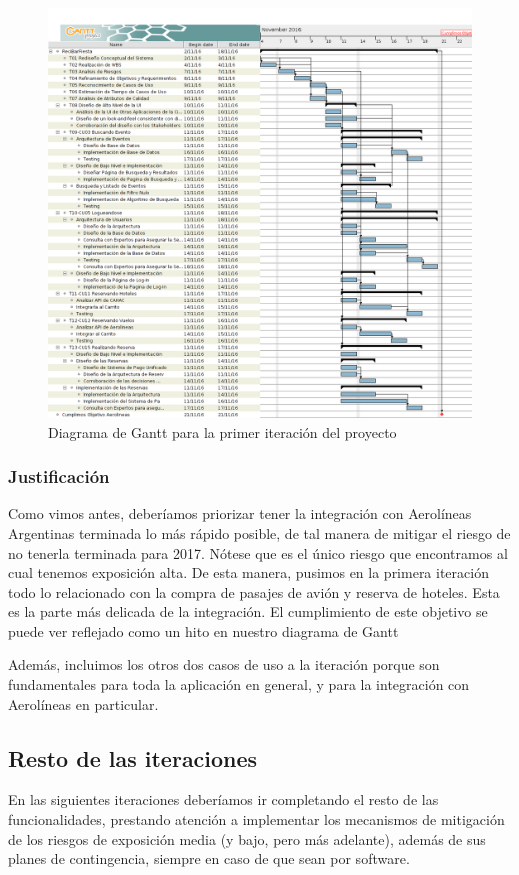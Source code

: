 \begin{figure}[H]
 \centering
  \includegraphics[width=\textwidth]{diagramas/gantt.png}
  \caption{Diagrama de Gantt para la primer iteración del proyecto}
  \label{fig:gantt}
\end{figure}

\subsubsection{Justificación}
Como vimos antes, deberíamos priorizar tener la integración con Aerolíneas Argentinas terminada lo más rápido posible, de tal manera de mitigar el riesgo de no tenerla terminada para 2017. Nótese que es el único riesgo que encontramos al cual tenemos exposición alta. De esta manera, pusimos en la primera iteración todo lo relacionado con la compra de pasajes de avión y reserva de hoteles. Esta es la parte más delicada de la integración. El cumplimiento de este objetivo se puede ver reflejado como un hito en nuestro diagrama de Gantt

Además, incluimos los otros dos casos de uso a la iteración porque son fundamentales para toda la aplicación en general, y para la integración con Aerolíneas en particular.

\subsection{Resto de las iteraciones}
En las siguientes iteraciones deberíamos ir completando el resto de las funcionalidades, prestando atención a implementar los mecanismos de mitigación de los riesgos de exposición media (y bajo, pero más adelante), además de sus planes de contingencia, siempre en caso de que sean por software.

